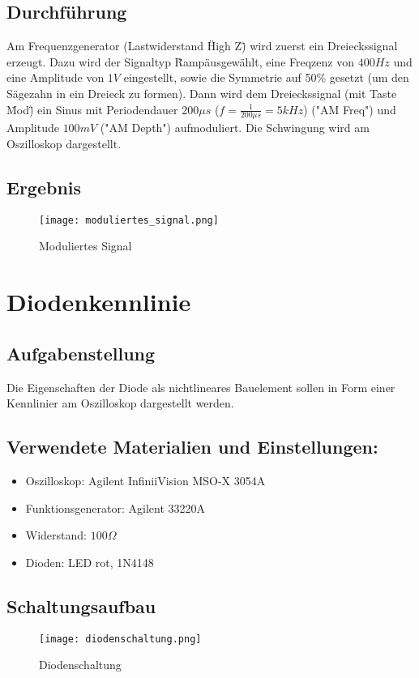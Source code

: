 \documentclass[12pt,a4paper,titlepage]{article}
\begin{document}
\subsection{Durchführung}
Am Frequenzgenerator (Lastwiderstand \"High Z\") wird zuerst ein Dreieckssignal erzeugt. Dazu wird der Signaltyp \"Ramp\" ausgewählt, eine Freqzenz von $400Hz$ und eine Amplitude von $1V$ eingestellt, sowie die Symmetrie auf 50\% gesetzt (um den Sägezahn in ein Dreieck zu formen). Dann wird dem Dreieckssignal (mit Taste \"Mod\") ein Sinus mit Periodendauer $200\mu s$ ($f = \frac{1}{200\mu s} = 5kHz$) ("AM Freq") und Amplitude $100mV$ ("AM Depth") aufmoduliert. Die Schwingung wird am Oszilloskop dargestellt.

\subsection{Ergebnis}

\begin{figure}[H]
  \centering
  \texttt{[image: moduliertes\_signal.png]}
  \caption{Moduliertes Signal}
\end{figure}

\section{Diodenkennlinie}

\subsection{Aufgabenstellung}
Die Eigenschaften der Diode als nichtlineares Bauelement sollen in Form einer Kennlinier am Oszilloskop dargestellt werden.

\subsection{Verwendete Materialien und Einstellungen:}
\begin{itemize}
  \item Oszilloskop: Agilent InfiniiVision MSO-X 3054A
  \item Funktionsgenerator: Agilent 33220A
  \item Widerstand: $100\Omega$
  \item Dioden: LED rot, 1N4148
\end{itemize}

\subsection{Schaltungsaufbau}
\begin{figure}[H]
  \centering
  \texttt{[image: diodenschaltung.png]}
  \caption{Diodenschaltung}
\end{figure}
\end{document}
